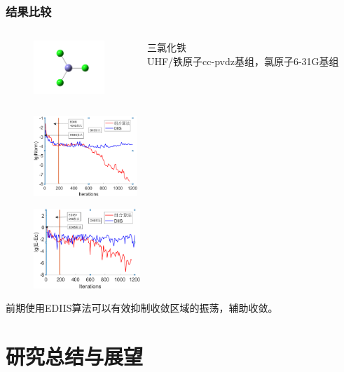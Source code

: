 \documentclass[10pt,aspectratio=43,mathserif,UTF8]{beamer}
\begin{document}
\begin{frame}
	\frametitle{结果比较}
	\begin{columns}[c]
		\begin{figure}[htbp]
			\includegraphics[height=2cm]{figure/FeCl3/FeCl32.png}
		\end{figure}

		三氯化铁\\
		UHF/铁原子cc-pvdz基组，氯原子6-31G基组
	\end{columns}
	\begin{figure}[ht!]
		\centering
		\begin{minipage}{0.4\linewidth}
			\centering
			\includegraphics[height=3cm]{figure/FeCl3/NORM4.png}
			\label{fig:FeCl3:E}
		\end{minipage}
		\begin{minipage}{0.4\linewidth}
			\centering
			\includegraphics[height=3cm]{figure/FeCl3/E5.png}
			\label{fig:FeCl3:FD}
		\end{minipage}
	\end{figure}
	前期使用EDIIS算法可以有效抑制收敛区域的振荡，辅助收敛。
\end{frame}

\section{研究总结与展望}
\end{document}
